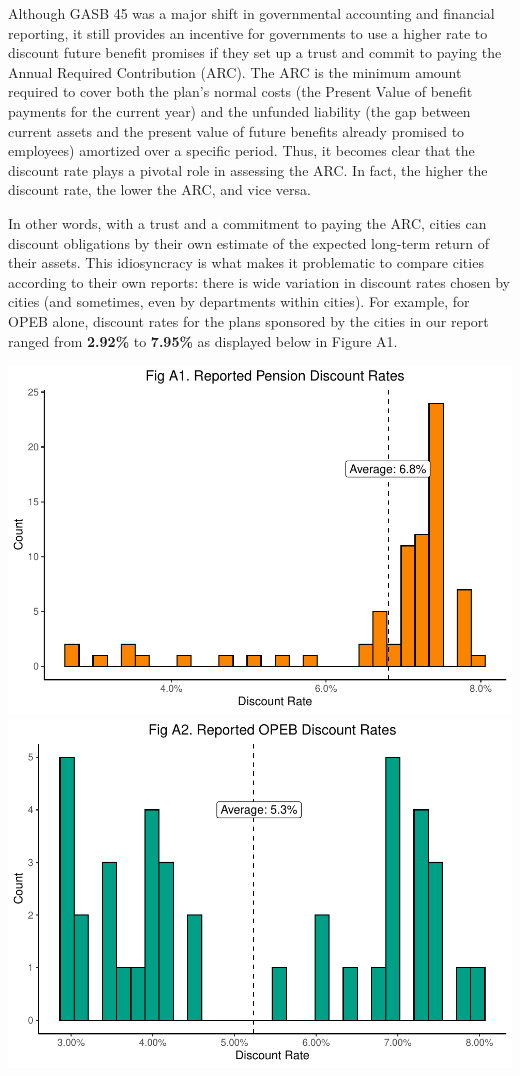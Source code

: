 \documentclass[
]{article}
\begin{document}
Although GASB 45 was a major shift in governmental accounting and
financial reporting, it still provides an incentive for governments to
use a higher rate to discount future benefit promises if they set up a
trust and commit to paying the Annual Required Contribution (ARC). The
ARC is the minimum amount required to cover both the plan's normal costs
(the Present Value of benefit payments for the current year) and the
unfunded liability (the gap between current assets and the present value
of future benefits already promised to employees) amortized over a
specific period. Thus, it becomes clear that the discount rate plays a
pivotal role in assessing the ARC. In fact, the higher the discount
rate, the lower the ARC, and vice versa.

In other words, with a trust and a commitment to paying the ARC, cities
can discount obligations by their own estimate of the expected long-term
return of their assets. This idiosyncracy is what makes it problematic
to compare cities according to their own reports: there is wide
variation in discount rates chosen by cities (and sometimes, even by
departments within cities). For example, for OPEB alone, discount rates
for the plans sponsored by the cities in our report ranged from
\textbf{2.92\%} to \textbf{7.95\%} as displayed below in Figure A1.

\includegraphics{City-Solvency-Report--Adjusted-_files/figure-latex/unnamed-chunk-15-1.pdf}
\includegraphics{City-Solvency-Report--Adjusted-_files/figure-latex/unnamed-chunk-15-2.pdf}
\end{document}
